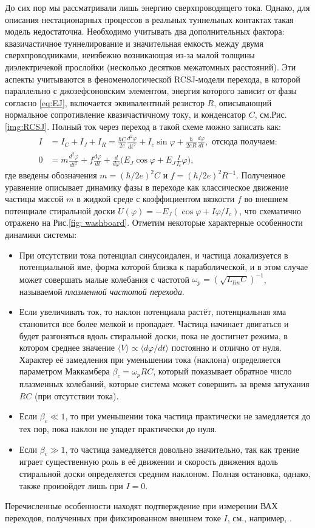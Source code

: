 До сих пор мы рассматривали лишь энергию сверхпроводящего тока. Однако, для описания нестационарных процессов в реальных туннельных контактах такая модель недостаточна. Необходимо учитывать два дополнительных фактора: квазичастичное туннелирование и значительная емкость между двумя сверхпроводниками, неизбежно возникающая из-за малой толщины диэлектричекой прослойки (несколько десятков межатомных расстояний). Эти аспекты учитываются в феноменологической RCSJ-модели перехода, в которой параллельно с джозефсоновским элементом, энергия которого зависит от фазы согласно \eqref{eq:EJ}, включается эквивалентный резистор $R$, описывающий нормальное сопротивление квазичастичному току, и конденсатор $C$, см.\:Рис.\:\ref{img:RCSJ}. Полный ток через переход в такой схеме можно записать как:
\begin{align}
I &= I_C + I_J + I_R = \frac{\hbar C}{2e} \frac{d^2\varphi}{dt^2}+I_c\sin \varphi+ \frac{\hbar}{2eR}\frac{d\varphi}{dt}, \text{ отсюда получаем:}  \nonumber \\
0 & = m\frac{d^2\varphi}{dt^2} + f \frac{d\varphi}{dt} + \frac{d}{d\varphi}\big(E_J\cos \varphi+E_J\frac{ I}{I_c}\varphi\big), 
\end{align}
где введены обозначения $m=(\hbar/2e)^2 C$ и $f=(\hbar/2e)^2R^{-1}$. Полученное уравнение описывает динамику фазы в переходе как классическое движение частицы массой $m$ в жидкой среде с коэффициентом вязкости $f$ во внешнем потенциале стиральной доски $U(\varphi)=-E_J(\cos \varphi+I\varphi/I_c)$, что схематично отражено на Рис.\:\ref{fig: washboard}. Отметим некоторые характерные особенности динамики системы:
\begin{itemize}
	\item При отсутствии тока потенциал синусоидален, и частица локализуется в потенциальной яме, форма которой близка к параболической, и в этом случае может совершать малые колебания с частотой $\omega_p = (\sqrt{L_{lin}C})^{-1}$, называемой \textit{плазменной частотой перехода}. 
	\item Если увеличивать ток, то наклон потенциала растёт, потенциальная яма становится все более мелкой и пропадает. Частица начинает двигаться и будет разгоняться вдоль стиральной доски, пока не достигнет режима, в котором среднее значение $\langle V \rangle  \propto \langle d\varphi/dt \rangle$ постоянно и отлично от нуля. Характер её замедления при уменьшении тока (наклона) определяется параметром Маккамбера $\beta_c = \omega_p R C$, который показывает обратное число плазменных колебаний, которые система может совершить за время затухания $RC$ (при отсутствии тока).
	\item Если $\beta_c\ll1$, то при уменьшении тока частица практически не замедляется до тех пор, пока наклон не упадет практически до нуля. 
	\item Если $\beta_c\gg1$, то частица замедляется довольно значительно, так как трение играет существенную роль в её движении и скорость движения вдоль стиральной доски определяется средним наклоном. Полная остановка, однако, также произойдет лишь при $I=0$.
\end{itemize}
Перечисленные особенности находят подтверждение при измерении ВАХ переходов, полученных при фиксированном внешнем токе $I$, см., например, \cite{Schmidt}. 

